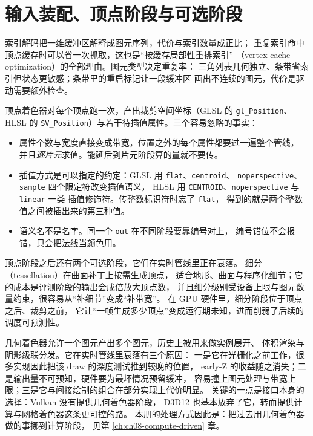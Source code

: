 \documentclass[12pt,a4paper,fontset=fandol]{ctexbook}
\newcommand{\Tp}[1]{\texttt{#1}}
\newcommand{\Lang}[1]{\textsf{#1}}
\newcommand{\DomGPU}{\Lang{GPU}}
\newcommand{\GSL}{\Lang{GLSL}}
\newcommand{\HSL}{\Lang{HLSL}}
\begin{document}
\section{输入装配、顶点阶段与可选阶段}

索引解码把一维缓冲区解释成图元序列，代价与索引数量成正比；
重复索引命中顶点缓存时可以省一次抓取，这也是``按缓存局部性重排索引''
（vertex cache optimization）的全部理由。图元类型决定重复率：
三角列表几何独立、条带省索引但状态更敏感；条带里的重启标记让一段缓冲区
画出不连续的图元，代价是驱动需要额外检查。

顶点着色器对每个顶点跑一次，产出裁剪空间坐标（\GSL{} 的 \Tp{gl\_Position}、
\HSL{} 的 \Tp{SV\_Position}）与若干待插值属性。三个容易忽略的事实：

\begin{itemize}
  \item 属性个数与宽度直接变成带宽，位置之外的每个属性都要过一遍整个管线，
        并且\emph{逐片元}求值。能延后到片元阶段算的量就不要传。
  \item 插值方式是可以指定的约定：\GSL{} 用 \Tp{flat}、\Tp{centroid}、
        \Tp{noperspective}、\Tp{sample} 四个限定符改变插值语义，
        \HSL{} 用 \Tp{CENTROID}、\Tp{noperspective} 与 \Tp{linear} 一类
        插值修饰符。传整数标识符时忘了 \Tp{flat}，
        得到的就是两个整数值之间被插出来的第三种值。
  \item 语义名不是名字。同一个 \Tp{out} 在不同阶段要靠编号对上，
        编号错位不会报错，只会把法线当颜色用。
\end{itemize}

顶点阶段之后还有两个可选阶段，它们在实时管线里正在衰落。
细分（tessellation）在曲面补丁上按需生成顶点，
适合地形、曲面与程序化细节；它的成本是评测阶段的输出会成倍放大顶点数，
并且细分级别受设备上限与图元数量约束，很容易从``补细节''变成``补带宽''。
在 \DomGPU{} 硬件里，细分阶段位于顶点之后、裁剪之前，
它让``一帧生成多少顶点''变成运行期未知，进而削弱了后续的调度可预测性。

几何着色器允许一个图元产出多个图元，历史上被用来做实例展开、
体积渲染与阴影级联分发。它在实时管线里衰落有三个原因：
一是它在光栅化之前工作，很多实现因此把该 draw 的深度测试推到较晚的位置，
early-Z 的收益随之消失；二是输出量不可预知，硬件要为最坏情况预留缓冲，
容易撞上图元处理与带宽上限；三是它与间接绘制的组合在部分实现上代价明显。
关键的一点是接口本身的选择：Vulkan 没有提供几何着色器阶段，
D3D12 也基本放弃了它，转而提供计算与网格着色器这条更可控的路。
本册的处理方式因此是：把过去用几何着色器做的事挪到计算阶段，
见第 \ref{ch:ch08-compute-driven} 章。
\end{document}
